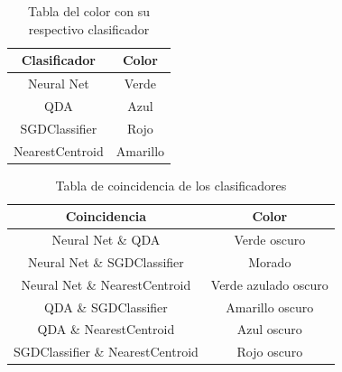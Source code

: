 \documentclass[conference]{IEEEtran}
\begin{document}
\begin{table}[h]
\centering
\begin{tabular}{|c|c|}
\hline
\textbf{Clasificador} & \textbf{Color} \\
\hline
Neural Net & \cellcolor[rgb]{0,1,0} Verde \\
\hline
QDA & \cellcolor[rgb]{0,0,1} Azul \\
\hline
SGDClassifier & \cellcolor[rgb]{1,0,0} Rojo \\
\hline
NearestCentroid & \cellcolor[rgb]{1,1,0} Amarillo \\
\hline
\end{tabular}
\caption{Tabla del color con su respectivo clasificador }
\label{TablaColorClasificador}
\end{table}

\begin{table}[h]
\centering
\begin{tabular}{|c|c|}
\hline
\textbf{Coincidencia} & \textbf{Color} \\
\hline
Neural Net \& QDA & \cellcolor[rgb]{0,0.5,0} Verde oscuro \\
\hline
Neural Net \& SGDClassifier & \cellcolor[rgb]{0.5,0,0.5} Morado \\
\hline
Neural Net \& NearestCentroid & \cellcolor[rgb]{0,0.5,0.5} Verde azulado oscuro \\
\hline
QDA \& SGDClassifier & \cellcolor[rgb]{0.5,0.5,0} Amarillo oscuro \\
\hline
QDA \& NearestCentroid & \cellcolor[rgb]{0,0,0.5} Azul oscuro \\
\hline
SGDClassifier \& NearestCentroid & \cellcolor[rgb]{0.5,0,0} Rojo oscuro \\
\hline
\end{tabular}
\caption{Tabla de coincidencia de los clasificadores }
\label{TablaConicidencia}
\end{table}
\end{document}
